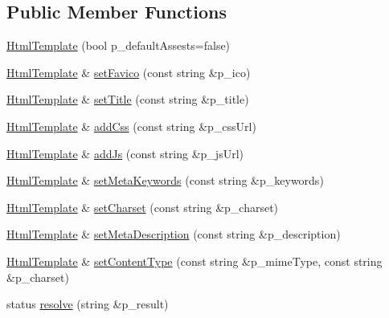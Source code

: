 \subsection*{Public Member Functions}
\begin{DoxyCompactItemize}
\item 
\hyperlink{classxtd_1_1network_1_1http_1_1HtmlTemplate_a2e40e5f2ad3b6b5cdb8b8f73656efe6d}{Html\+Template} (bool p\+\_\+default\+Assests=false)
\item 
\hyperlink{classxtd_1_1network_1_1http_1_1HtmlTemplate}{Html\+Template} \& \hyperlink{classxtd_1_1network_1_1http_1_1HtmlTemplate_a92496dd5d269160aeb2640908b1920a1}{set\+Favico} (const string \&p\+\_\+ico)
\item 
\hyperlink{classxtd_1_1network_1_1http_1_1HtmlTemplate}{Html\+Template} \& \hyperlink{classxtd_1_1network_1_1http_1_1HtmlTemplate_a360a57a8ca473b72fd76807d5cc7265a}{set\+Title} (const string \&p\+\_\+title)
\item 
\hyperlink{classxtd_1_1network_1_1http_1_1HtmlTemplate}{Html\+Template} \& \hyperlink{classxtd_1_1network_1_1http_1_1HtmlTemplate_a29763c3949d6906bdbe02e9b147deacc}{add\+Css} (const string \&p\+\_\+css\+Url)
\item 
\hyperlink{classxtd_1_1network_1_1http_1_1HtmlTemplate}{Html\+Template} \& \hyperlink{classxtd_1_1network_1_1http_1_1HtmlTemplate_a4a16bbd6749d71c5fe72d9e8bf3c1fa8}{add\+Js} (const string \&p\+\_\+js\+Url)
\item 
\hyperlink{classxtd_1_1network_1_1http_1_1HtmlTemplate}{Html\+Template} \& \hyperlink{classxtd_1_1network_1_1http_1_1HtmlTemplate_a1a87439632dc4f30fb247602b1bbadba}{set\+Meta\+Keywords} (const string \&p\+\_\+keywords)
\item 
\hyperlink{classxtd_1_1network_1_1http_1_1HtmlTemplate}{Html\+Template} \& \hyperlink{classxtd_1_1network_1_1http_1_1HtmlTemplate_a67b44ce076eac00c888eb24ec3b9675b}{set\+Charset} (const string \&p\+\_\+charset)
\item 
\hyperlink{classxtd_1_1network_1_1http_1_1HtmlTemplate}{Html\+Template} \& \hyperlink{classxtd_1_1network_1_1http_1_1HtmlTemplate_a4ef586066cbae8ffc86e851dbb43782c}{set\+Meta\+Description} (const string \&p\+\_\+description)
\item 
\hyperlink{classxtd_1_1network_1_1http_1_1HtmlTemplate}{Html\+Template} \& \hyperlink{classxtd_1_1network_1_1http_1_1HtmlTemplate_ad2b01a5058edcc704e2f0057e7cd7d06}{set\+Content\+Type} (const string \&p\+\_\+mime\+Type, const string \&p\+\_\+charset)
\item 
status \hyperlink{classxtd_1_1network_1_1http_1_1HtmlTemplate_af621b5bf866fa828f0bd5eaf225d5f70}{resolve} (string \&p\+\_\+result)
\end{DoxyCompactItemize}
